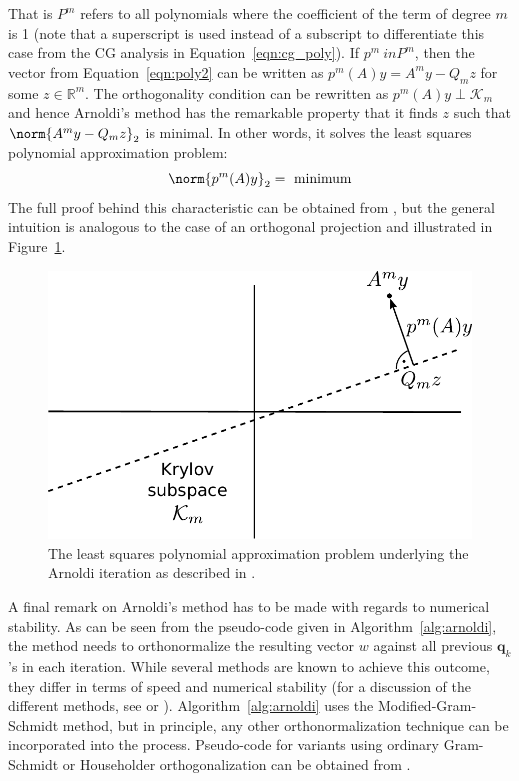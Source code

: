 \noindent  That is $P^m$ refers to all polynomials where the coefficient of the term of degree $m$ is 1 (note that a superscript is used instead of a subscript to differentiate this case from the CG analysis in Equation~\hyperref[eqn:cg_poly]{\ref{eqn:cg_poly}}). If $p^m \ in P^m$, then the vector from Equation~\hyperref[eqn:poly2]{\ref{eqn:poly2}} can be written as $p^m(A)y=A^my-Q_mz$ for some $z \in \mathbb{R}^m$. The orthogonality condition can be rewritten as $p^m(A)y \perp \mathcal{K}_m$ and hence Arnoldi's method has the remarkable property that it finds $z$ such that $\norm{A^my-Q_mz}_2$ is minimal. In other words, it solves the least squares polynomial approximation problem:
\begin{equation}
\label{eqn:poly_arnoldi}
    \norm{p^m(A)y}_2 = \text{ minimum}
\end{equation}
\noindent The full proof behind this characteristic can be obtained from \cite{trefethen_numerical_1997}, but the general intuition is analogous to the case of an orthogonal projection and illustrated in Figure~\hyperref[fig:arnoldi]{\ref{fig:arnoldi}}.

\begin{figure}[h]
    \centering
    \includegraphics[width=0.6\linewidth]{figures/Arnoldi.pdf}
    \caption[Arnoldi - Least Squares Approximation]{The least squares polynomial approximation problem underlying the Arnoldi iteration as described in \cite{trefethen_numerical_1997}.}
    \label{fig:arnoldi}
\end{figure}

\noindent A final remark on Arnoldi's method has to be made with regards to numerical stability. As can be seen from the pseudo-code given in Algorithm~\hyperref[alg:arnoldi]{\ref{alg:arnoldi}}, the method needs to orthonormalize the resulting vector $w$ against all previous $\bm{q}_k$'s in each iteration. While several methods are known to achieve this outcome, they differ in terms of speed and numerical stability (for a discussion of the different methods, see \cite{golub_matrix_2013} or \cite{trefethen_numerical_1997}). Algorithm~\hyperref[alg:arnoldi]{\ref{alg:arnoldi}} uses the Modified-Gram-Schmidt method, but in principle, any other orthonormalization technique can be incorporated into the process. Pseudo-code for variants using ordinary Gram-Schmidt or Householder orthogonalization can be obtained from \cite{saad_iterative_2003}.


